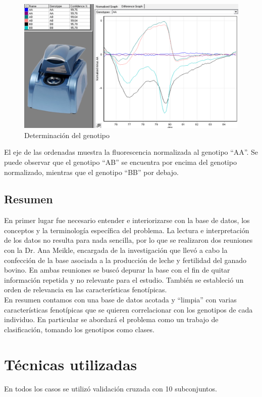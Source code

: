 \documentclass[12pt,a4paper,titlepage]{report}
\begin{document}
\begin{figure}[H]
	\centering 
	\includegraphics[width=.8\textwidth]{./pics/genotipos.png}
	\caption{Determinación del genotipo}
	\label{fig:genotipo}
\end{figure}

El eje de las ordenadas muestra la fluorescencia normalizada al genotipo ``AA''. Se puede observar que el genotipo ``AB'' se encuentra por encima del genotipo normalizado, mientras que el genotipo ``BB'' por debajo.

\section{Resumen}
En primer lugar fue necesario entender e interiorizarse con la base de datos, los conceptos y la terminología específica del problema. La lectura e interpretación de los datos no resulta para nada sencilla, por lo que se realizaron dos reuniones con la Dr. Ana Meikle, encargada de la investigación que llevó a cabo la confección de la base asociada a la producción de leche y fertilidad del ganado bovino. En ambas reuniones se buscó depurar la base con el fin de quitar información repetida y no relevante para el estudio. También se estableció un orden de relevancia en las características fenotípicas.\\

En resumen contamos con una base de datos acotada y ``limpia'' con varias características fenotípicas que se quieren correlacionar con los genotipos de cada individuo. En particular se abordará el problema como un trabajo de clasificación, tomando los genotipos como clases.

\chapter{Técnicas utilizadas}
	En todos los casos se utilizó validación cruzada con 10 subconjuntos.\\
	
\end{document}
